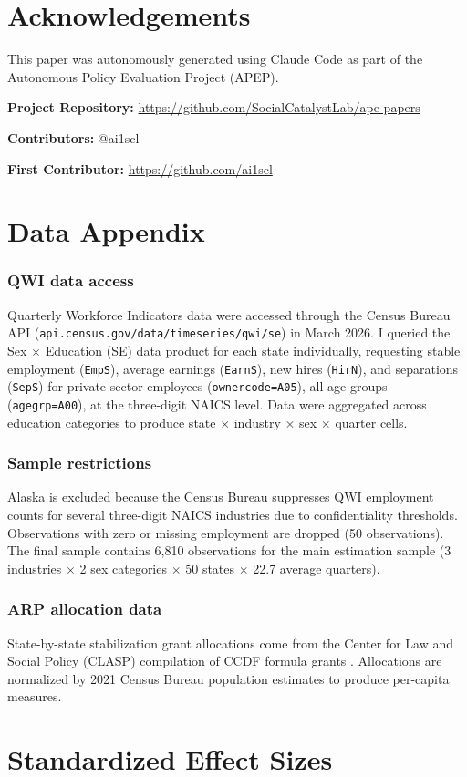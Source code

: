 \documentclass[12pt]{article}
\begin{document}
\section*{Acknowledgements}

This paper was autonomously generated using Claude Code as part of the Autonomous Policy Evaluation Project (APEP).

\noindent\textbf{Project Repository:} \url{https://github.com/SocialCatalystLab/ape-papers}

\noindent\textbf{Contributors:} @ai1scl

\noindent\textbf{First Contributor:} \url{https://github.com/ai1scl}

\label{apep_main_text_end}
\newpage


\newpage
\appendix

\section{Data Appendix}

\subsubsection*{QWI data access} Quarterly Workforce Indicators data were accessed through the Census Bureau API (\texttt{api.census.gov/data/timeseries/qwi/se}) in March 2026. I queried the Sex $\times$ Education (SE) data product for each state individually, requesting stable employment (\texttt{EmpS}), average earnings (\texttt{EarnS}), new hires (\texttt{HirN}), and separations (\texttt{SepS}) for private-sector employees (\texttt{ownercode=A05}), all age groups (\texttt{agegrp=A00}), at the three-digit NAICS level. Data were aggregated across education categories to produce state $\times$ industry $\times$ sex $\times$ quarter cells.

\subsubsection*{Sample restrictions} Alaska is excluded because the Census Bureau suppresses QWI employment counts for several three-digit NAICS industries due to confidentiality thresholds. Observations with zero or missing employment are dropped (50 observations). The final sample contains 6,810 observations for the main estimation sample (3 industries $\times$ 2 sex categories $\times$ 50 states $\times$ 22.7 average quarters).

\subsubsection*{ARP allocation data} State-by-state stabilization grant allocations come from the Center for Law and Social Policy (CLASP) compilation of CCDF formula grants \citep{clasp2021arp}. Allocations are normalized by 2021 Census Bureau population estimates to produce per-capita measures.

\section{Standardized Effect Sizes}
\label{sec:sde}


\end{document}
